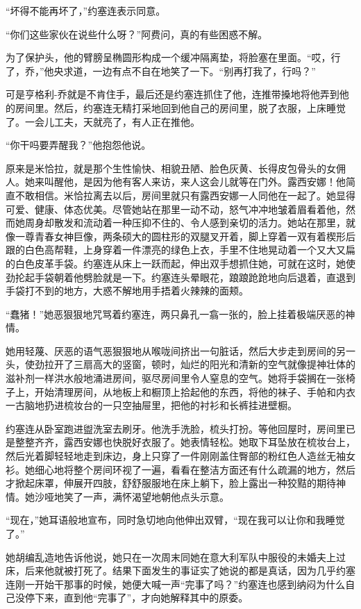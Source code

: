     “坏得不能再坏了，”约塞连表示同意。

    “你们这些家伙在说些什么呀？”阿费问，真的有些困惑不解。

    为了保护头，他的臂膀呈椭圆形构成一个缓冲隔离垫，将脸塞在里面。“哎，行了，乔，”他央求道，一边有点不自在地笑了一下。“别再打我了，行吗？”

    可是亨格利-乔就是不肯住手，最后还是约塞连抓住了他，连推带搡地将他弄到他的房间里。然后，约塞连无精打采地回到他自己的房间里，脱了衣服，上床睡觉了。一会儿工夫，天就亮了，有人正在推他。

    “你干吗要弄醒我？”他抱怨他说。

    原来是米恰拉，就是那个生性愉快、相貌丑陋、脸色灰黄、长得皮包骨头的女佣人。她来叫醒他，是因为他有客人来访，来人这会儿就等在门外。露西安娜！他简直不敢相信。米恰拉离去以后，房间里就只有露西安娜一人同他在一起了。她显得可爱、健康、体态优美。尽管她站在那里一动不动，怒气冲冲地皱着眉看着他，然而她周身却散发和流动着一种压抑不住的、令人感到亲切的活力。她站在那里，就像一尊青春女神巨像，两条硕大的圆柱形的双腿叉开着，脚上穿着一双有着楔形后跟的白色高帮鞋，上身穿着一件漂亮的绿色上衣，手里不住地晃动着一个又大又扁的白色皮革手袋。约塞连从床上一跃而起，伸出双手想抓住她，可就在这时，她使劲抡起手袋朝着他劈脸就是一下。约塞连头晕眼花，踉踉跄跄地向后退着，直退到手袋打不到的地方，大惑不解地用手捂着火辣辣的面颊。

    “蠢猪！”她恶狠狠地咒骂着约塞连，两只鼻孔一翕一张的，脸上挂着极端厌恶的神情。

    她用轻蔑、厌恶的语气恶狠狠地从喉咙间挤出一句脏话，然后大步走到房间的另一头，使劲拉开了三扇高大的竖窗，顿时，灿烂的阳光和清新的空气就像提神壮体的滋补剂一样洪水般地涌进房间，驱尽房间里令人窒息的空气。她将手袋搁在一张椅子上，开始清理房间，从地板上和橱顶上拾起他的东西，将他的袜子、手帕和内衣一古脑地扔进梳妆台的一只空抽屉里，把他的衬衫和长裤挂进壁橱。

    约塞连从卧室跑进盥洗室去刷牙。他洗手洗脸，梳头打扮。等他回屋时，房间里已是整整齐齐，露西安娜也快脱好衣服了。她表情轻松。她取下耳坠放在梳妆台上，然后光着脚轻轻地走到床边，身上只穿了一件刚刚盖住臀部的粉红色人造丝无袖女衫。她细心地将整个房间环视了一遍，看看在整洁方面还有什么疏漏的地方，然后才掀起床罩，伸展开四肢，舒舒服服地在床上躺下，脸上露出一种狡黠的期待神情。她沙哑地笑了一声，满怀渴望地朝他点头示意。

    “现在，”她耳语般地宣布，同时急切地向他伸出双臂，“现在我可以让你和我睡觉了。”

    她胡编乱造地告诉他说，她只在一次周末同她在意大利军队中服役的未婚夫上过床，后来他就被打死了。结果下面发生的事证实了她说的都是真话，因为几乎约塞连刚一开始干那事的时候，她便大喊一声“完事了吗？”约塞连也感到纳闷为什么自己没停下来，直到他“完事了”，才向她解释其中的原委。

